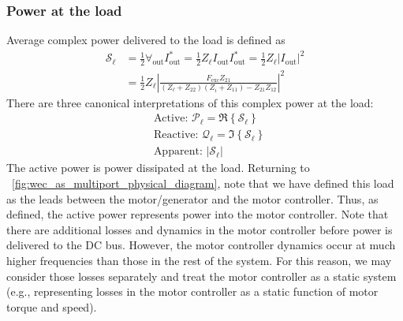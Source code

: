 \documentclass[twocolumn]{autart}
\begin{document}
\subsubsection{Power at the load}\label{sec:power_at_the_load}
Average complex power delivered to the load is defined as 
\begin{equation}
\begin{aligned}
        \mathcal{S}_{\ell} &= \frac{1}{2} \forall_{\textrm{out}} I_{\textrm{out}}^* = \frac{1}{2} Z_\ell I_{\textrm{out}} I_{\textrm{out}}^* = \frac{1}{2} Z_\ell | I_{\textrm{out}} |^2 \\
        &= \frac{1}{2} Z_\ell \left| \frac{F_{\textrm{exc}} Z_{21}}{ (Z_\ell + Z_{22}) (Z_i + Z_{11}) - Z_{21} Z_{12}  } \right|^2 
\end{aligned}
\end{equation}
%
There are three canonical interpretations of this complex power at the load:
%
\begin{subequations}
\begin{align}
        &\textrm{Active: } \mathcal{P}_{\ell} = \Re \left\{ \mathcal{S}_{\ell} \right\} \\[0.5em]
        &\textrm{Reactive: } \mathcal{Q}_{\ell} = \Im \left\{ \mathcal{S}_{\ell} \right\} \\[0.5em]
        &\textrm{Apparent: } | \mathcal{S}_{\ell} |
\end{align}\label{eq:load_power_types}%
\end{subequations}
%
The active power is power dissipated at the load.
Returning to \figurename~\ref{fig:wec_as_multiport_physical_diagram}, note that we have defined this load as the leads between the motor/generator and the motor controller.
Thus, as defined, the active power represents power into the motor controller.
Note that there are additional losses and dynamics in the motor controller before power is delivered to the DC bus.
However, the motor controller dynamics occur at much higher frequencies than those in the rest of the system.
For this reason, we may consider those losses separately and treat the motor controller as a static system (e.g., representing losses in the motor controller as a static function of motor torque and speed).

\end{document}
